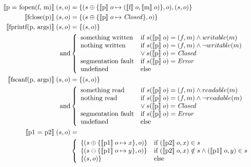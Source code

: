 \begin{align*}
\llbracket \text{p = fopen(f, m)} \rrbracket \; (s,o) &= \{ (s \oplus \{ \llbracket \text{p} \rrbracket \; o \mapsto (\llbracket \text{f} \rrbracket \; o, \llbracket \text{m} \rrbracket \; o) \}, o), (s,o) \}\\
\llbracket \text{fclose(p)} \rrbracket \; (s,o) &= \{(s \oplus \{ \llbracket \text{p} \rrbracket \; o \mapsto \mathit{Closed} \}, o)\}\\
\llbracket \text{fprintf(p, args)} \rrbracket \; (s,o) &= \{(s,o)\}\\
	\text{ and}&
	\left\{\begin{array}{ll}
	\text{something written} & \text{if } s(\llbracket \text{p} \rrbracket \; o) = (f,m) \wedge writable(m)\\
	\text{nothing written} & \text{if } s(\llbracket \text{p} \rrbracket \; o) = (f,m) \wedge \neg writable(m)\\
	& \vee \: s(\llbracket \text{p} \rrbracket \; o) = \mathit{Closed}\\
	\text{segmentation fault} & \text{if } s(\llbracket \text{p} \rrbracket \; o) = \mathit{Error}\\
	\text{undefined} & \text{else}
	\end{array}\right.\\
\llbracket \text{fscanf(p, args)} \rrbracket \; (s,o) &= \{(s,o)\}\\
	\text{ and}&
	\left\{\begin{array}{ll}
	\text{something read} & \text{if } s(\llbracket \text{p} \rrbracket \; o) = (f,m) \wedge readable(m)\\
	\text{nothing read} & \text{if } s(\llbracket \text{p} \rrbracket \; o) = (f,m) \wedge \neg readable(m)\\
	& \vee \: s(\llbracket \text{p} \rrbracket \; o) = \mathit{Closed}\\
	\text{segmentation fault} & \text{if } s(\llbracket \text{p} \rrbracket \; o) = \mathit{Error}\\
	\text{undefined} & \text{else}
	\end{array}\right.\\
\llbracket \text{p1 = p2} \rrbracket \; (s,o) &=\\ &\left\{\begin{array}{ll}
	\{(s \oplus \{ \llbracket \text{p1} \rrbracket \; o \mapsto x \}, o)\} & \text{if } (\llbracket \text{p2} \rrbracket \; o, x) \in s\\
	\{(s \ominus \{ \llbracket \text{p1} \rrbracket \; o \mapsto y \}, o)\} & \text{if } (\llbracket \text{p2} \rrbracket \; o, x) \notin s \wedge (\llbracket \text{p1} \rrbracket \; o, y) \in s\\
	\{(s,o)\} & \text{else}
	\end{array}\right.
\end{align*}

